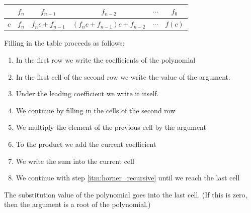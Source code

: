 \documentclass[margin=0px]{article}
\begin{document}
\begin{center}
    \begin{tabular}{|c|c|c|c|c|c|}
        \hline     & $f_n$ & $f_{n-1}$      & $f_{n-2}$                 & $\cdots$ & $f_0$  \\
        \hline $c$ & $f_n$ & $f_nc+f_{n-1}$ & $(f_nc+f_{n-1})c+f_{n-2}$ & $\cdots$ & $f(c)$ \\
        \hline
    \end{tabular}
\end{center}
Filling in the table proceeds as follows:
\begin{enumerate}
    \item In the first row we write the coefficients of the polynomial
    \item In the first cell of the second row we write the value of the argument.
    \item Under the leading coefficient we write it itself.
    \item We continue by filling in the cells of the second row
    \item \label{itm:horner_recursive} We multiply the element of the previous cell by the argument
    \item To the product we add the current coefficient
    \item We write the sum into the current cell
    \item We continue with step \ref{itm:horner_recursive} until we reach the last cell
\end{enumerate}

\noindent
The substitution value of the polynomial goes into the last cell. (If this is zero, then the argument is a root of the polynomial.)
\end{document}
